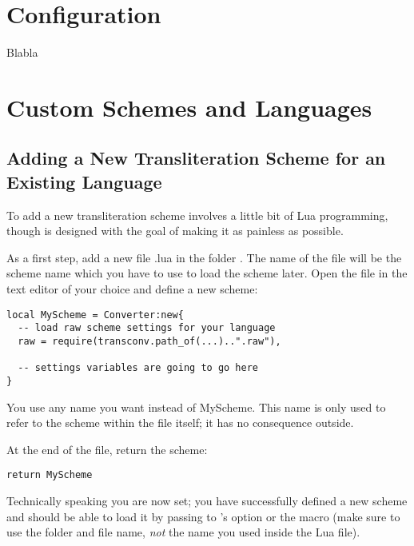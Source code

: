 \documentclass{ltxdockit}
\begin{document}
\section{Configuration}

\begin{ltxsyntax}

  Blabla
\end{ltxsyntax}

\section{Custom Schemes and Languages}

\subsection{Adding a New Transliteration Scheme for an Existing Language}

To add a new transliteration scheme involves a little bit of Lua programming,
though  is designed with the goal of making it as painless as
possible.

As a first step, add a new file .lua in the folder . The
name of the file will be the scheme name which you have to use to load the
scheme later. Open the file in the text editor of your choice and define a new
scheme:

\begin{lstlisting}
local MyScheme = Converter:new{
  -- load raw scheme settings for your language
  raw = require(transconv.path_of(...)..".raw"),

  -- settings variables are going to go here
}
\end{lstlisting}

You use any name you want instead of MyScheme. This name is only used to refer
to the scheme within the file itself; it has no consequence outside.

At the end of the file, return the scheme:

\begin{lstlisting}
return MyScheme
\end{lstlisting}

Technically speaking you are now set; you have successfully defined a new scheme
and should be able to load it by passing  to
's  option or the
 macro (make sure to use the
folder and file name, \emph{not} the name you used inside the Lua file).
\end{document}
